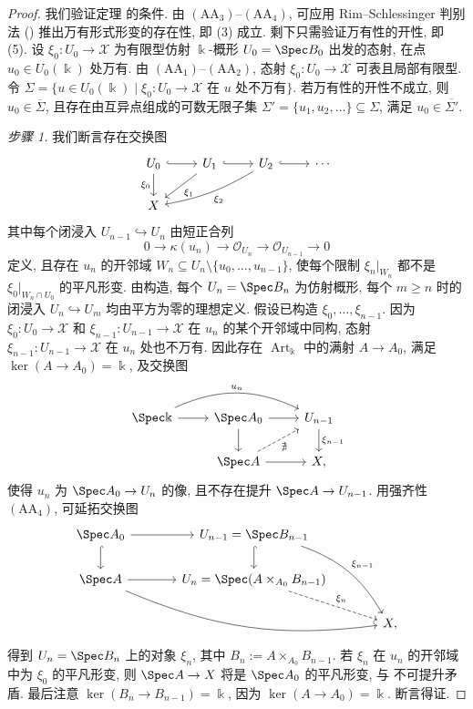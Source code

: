 \begin{proof}
我们验证定理  的条件. 由 $(\mathrm{AA}_3)$--$(\mathrm{AA}_4)$, 可应用 Rim--Schlessinger 判别法 () 推出万有形式形变的存在性, 即 (3) 成立. 剩下只需验证万有性的开性, 即 (5). 设 $\xi_0:U_0\to\mathcal X$ 为有限型仿射 $\Bbbk$-概形 $U_0=\Spec B_0$ 出发的态射, 在点 $u_0\in U_0(\Bbbk)$ 处万有. 由 $(\mathrm{AA}_1)$--$(\mathrm{AA}_2)$, 态射 $\xi_0:U_0\to\mathcal X$ 可表且局部有限型. 令 $\Sigma=\{u\in U_0(\Bbbk)\mid\xi_0:U_0\to\mathcal X\text{ 在 }u\text{ 处不万有}\}$. 若万有性的开性不成立, 则 $u_0\in\overline\Sigma$, 且存在由互异点组成的可数无限子集 $\Sigma'=\{u_1,u_2,\ldots\}\subseteq\Sigma$, 满足 $u_0\in\overline{\Sigma'}$.

\textit{步骤 1.} 我们断言存在交换图
\[
\begin{tikzcd}
U_0\arrow[r,hook]\arrow[d,"\xi_0"']&U_1\arrow[r,hook]\arrow[dl,"\xi_1"]&U_2\arrow[r,hook]\arrow[dll,bend left=10,"\xi_2"]&\cdots\\
\mathcal X&&&
\end{tikzcd}
\]
其中每个闭浸入 $U_{n-1}\hookrightarrow U_n$ 由短正合列
\[
0\to\kappa(u_n)\to\mathcal O_{U_n}\to\mathcal O_{U_{n-1}}\to0
\]
定义, 且存在 $u_n$ 的开邻域 $W_n\subseteq U_n\setminus\{u_0,\ldots,u_{n-1}\}$, 使每个限制 $\xi_n|_{W_n}$ 都不是 $\xi_0|_{W_n\cap U_0}$ 的平凡形变. 由构造, 每个 $U_n=\Spec B_n$ 为仿射概形, 每个 $m\geq n$ 时的闭浸入 $U_n\hookrightarrow U_m$ 均由平方为零的理想定义. 假设已构造 $\xi_0,\ldots,\xi_{n-1}$. 因为 $\xi_0:U_0\to\mathcal X$ 和 $\xi_{n-1}:U_{n-1}\to\mathcal X$ 在 $u_n$ 的某个开邻域中同构, 态射 $\xi_{n-1}:U_{n-1}\to\mathcal X$ 在 $u_n$ 处也不万有. 因此存在 $\operatorname{Art}_{\Bbbk}$ 中的满射 $A\to A_0$, 满足 $\ker(A\to A_0)=\Bbbk$, 及交换图
\begin{equation}\label{src:C.7.5}
\begin{tikzcd}
\Spec\Bbbk\arrow[r]\arrow[rr,bend left=25,"u_n"]&\Spec A_0\arrow[r]\arrow[d]&U_{n-1}\arrow[d,"\xi_{n-1}"]\\
&\Spec A\arrow[r]\arrow[ur,dashed,"\nexists"']&\mathcal X,
\end{tikzcd}
\end{equation}
使得 $u_n$ 为 $\Spec A_0\to U_n$ 的像, 且不存在提升 $\Spec A\to U_{n-1}$. 用强齐性 $(\mathrm{AA}_4)$, 可延拓交换图
\[
\begin{tikzcd}[column sep=large]
\Spec A_0\arrow[r]\arrow[d,hook]&U_{n-1}=\Spec B_{n-1}\arrow[d,hook]\arrow[ddr,bend left=20,"\xi_{n-1}"]&\\
\Spec A\arrow[r]\arrow[drr,bend right=15]&U_n=\Spec(A\times_{A_0}B_{n-1})\arrow[dr,dashed,"\xi_n"]&\\
&&\mathcal X,
\end{tikzcd}
\]
得到 $U_n=\Spec B_n$ 上的对象 $\xi_n$, 其中 $B_n:=A\times_{A_0}B_{n-1}$. 若 $\xi_n$ 在 $u_n$ 的开邻域中为 $\xi_0$ 的平凡形变, 则 $\Spec A\to\mathcal X$ 将是 $\Spec A_0$ 的平凡形变, 与  不可提升矛盾. 最后注意 $\ker(B_n\to B_{n-1})=\Bbbk$, 因为 $\ker(A\to A_0)=\Bbbk$. 断言得证.


\end{proof}
